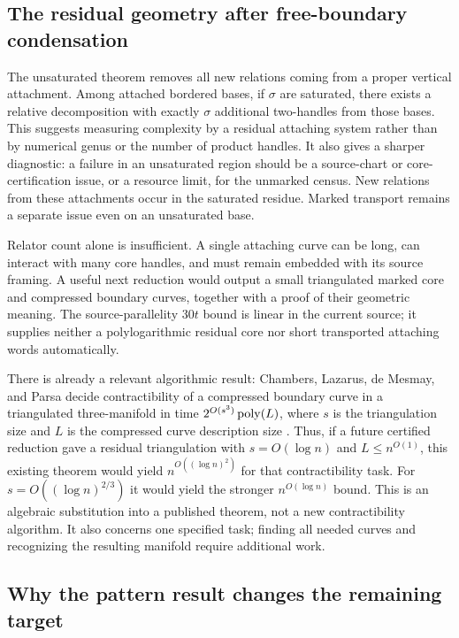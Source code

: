 \subsection{The residual geometry after free-boundary condensation}

The unsaturated theorem removes all new relations coming from a proper
vertical attachment. Among attached bordered bases, if $\sigma$ are saturated,
there exists a relative decomposition with exactly $\sigma$ additional
two-handles from those bases.
This suggests measuring complexity by a residual attaching system rather than
by numerical genus or the number of product handles. It also gives a sharper
diagnostic: a failure in an unsaturated region should be a source-chart or
core-certification issue, or a resource limit, for the unmarked census. New
relations from these attachments occur in the saturated residue. Marked
transport remains a separate issue even on an unsaturated base.

Relator count alone is insufficient. A single attaching curve can be long,
can interact with many core handles, and must remain embedded with its source
framing. A useful next reduction would output a small triangulated marked core
and compressed boundary curves, together with a proof of their geometric
meaning. The source-parallelity $30t$ bound is linear in the current source;
it supplies neither a polylogarithmic residual core nor short transported
attaching words automatically.

There is already a relevant algorithmic result: Chambers, Lazarus, de Mesmay,
and Parsa decide contractibility of a compressed boundary curve in a
triangulated three-manifold in time
$2^{O(s^3)}\operatorname{poly}(L)$, where $s$ is the triangulation size and $L$ is the
compressed curve description size \cite{compressed-contractibility}.
Thus, if a future certified reduction gave a residual triangulation with
$s=O(\log n)$ and $L\leq n^{O(1)}$, this existing theorem would yield
$n^{O((\log n)^2)}$ for that contractibility task. For
$s=O((\log n)^{2/3})$ it would yield the stronger $n^{O(\log n)}$ bound.
This is an algebraic substitution into a published theorem, not a new
contractibility algorithm. It also concerns one specified task; finding all
needed curves and recognizing the resulting manifold require additional work.

\subsection{Why the pattern result changes the remaining target}

